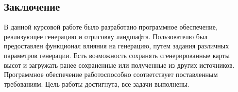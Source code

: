 \documentclass{article}
\begin{document}
	\newpage
	\begin{center}
		\section*{Заключение}
	\end{center}
	\indent \indent В данной курсовой работе было разработано программное обеспечение, реализующее генерацию и отрисовку ландшафта. Пользователю был предоставлен функционал влияния на генерацию, путем задания различных параметров генерации. Есть возможность сохранять сгенерированные карты высот и загружать ранее сохраненные или полученные из других источников. 
\\ \indent Программное обеспечение работоспособно соответствует поставленным требованиям. Цель работы достигнута, все задачи выполнены.
	\newpage
	
\end{document}
